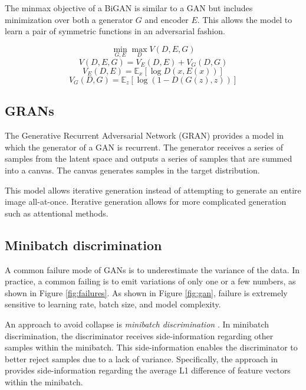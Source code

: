 \documentclass{article}
\begin{document}
The minmax objective of a BiGAN is similar to a GAN but includes minimization over both a generator $G$ and encoder $E$. This allows the model to learn a pair of symmetric functions in an adversarial fashion.

$$ \min_{G, E} \max_D V(D,E,G) $$
$$ V(D,E,G) = V_E(D, E) + V_G(D, G) $$
$$ V_E(D,E) = \mathbb{E}_{x}[ \log D(x, E(x))] $$
$$ V_G(D,G) =  \mathbb{E}_z[ \log(1-D(G(z),z))] $$

\subsection{GRANs}

The Generative Recurrent Adversarial Network (GRAN) \cite{Im2016} provides a model in which the generator of a GAN is recurrent. The generator receives a series of samples from the latent space and outputs a series of samples that are summed into a canvas. The canvas generates samples in the target distribution. 

This model allows iterative generation instead of attempting to generate an entire image all-at-once. Iterative generation allows for more complicated generation such as attentional methods.

\subsection{Minibatch discrimination}

A common failure mode of GANs is to underestimate the variance of the data. In practice, a common failing is to emit variations of only one or a few numbers, as shown in Figure \ref{fig:failures}. As shown in Figure \ref{fig:gan}, failure is extremely sensitive to learning rate, batch size, and model complexity.

An approach to avoid collapse is \textit{minibatch discrimination} \cite{Salimans2016}. In minibatch discrimination, the discriminator receives side-information regarding other samples within the minibatch. This side-information enables the discriminator to better reject samples due to a lack of variance. Specifically, the approach in  \cite{Salimans2016} provides side-information regarding the average L1 difference of feature vectors within the minibatch. 
\end{document}
